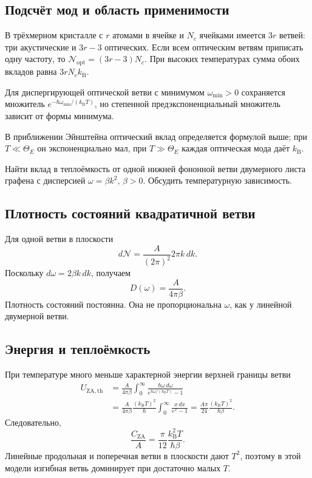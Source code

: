 \documentclass[../final.tex]{subfiles}
\begin{document}
\subsection*{Подсчёт мод и область применимости}

В трёхмерном кристалле с $r$ атомами в ячейке и $N_c$ ячейками
имеется $3r$ ветвей: три акустические и $3r-3$ оптических.
Если всем оптическим ветвям приписать одну частоту, то
$\mathcal N_{\mathrm{opt}}=(3r-3)N_c$.
При высоких температурах сумма обоих вкладов равна
$3rN_ck_{\mathrm B}$.

 Для диспергирующей оптической ветви
с минимумом $\omega_{\min}>0$ сохраняется множитель
$e^{-\hbar\omega_{\min}/(k_{\mathrm B}T)}$,
но степенной предэкспоненциальный множитель зависит от формы минимума.

\answer
В приближении Эйнштейна оптический вклад определяется формулой выше;
при $T\ll\Theta_E$ он экспоненциально мал, при $T\gg\Theta_E$
каждая оптическая мода даёт $k_{\mathrm B}$.


\condition
Найти вклад в теплоёмкость от одной нижней фононной ветви
двумерного листа графена с дисперсией $\omega=\beta k^2$, $\beta>0$.
Обсудить температурную зависимость.

\solution

\subsection*{Плотность состояний квадратичной ветви}

Для одной ветви в плоскости
\[
    d\mathcal N=\frac A{(2\pi)^2}2\pi k\,dk.
\]
Поскольку $d\omega=2\beta k\,dk$, получаем
\[
    D(\omega)=\frac A{4\pi\beta}.
\]
Плотность состояний постоянна. Она не пропорциональна $\omega$,
как у линейной двумерной ветви.

\subsection*{Энергия и теплоёмкость}

При температуре много меньше характерной энергии верхней границы ветви
\begin{align*}
    U_{\mathrm{ZA,th}}
       &=\frac A{4\pi\beta}\int_0^\infty
          \frac{\hbar\omega\,d\omega}{e^{\hbar\omega/(k_{\mathrm B}T)}-1}\\
       &=\frac A{4\pi\beta}\frac{(k_{\mathrm B}T)^2}{\hbar}
          \int_0^\infty\frac{x\,dx}{e^x-1}
        =\frac{A\pi}{24}\frac{(k_{\mathrm B}T)^2}{\hbar\beta}.
\end{align*}
Следовательно,
\[
    \frac{C_{\mathrm{ZA}}}{A}
       =\frac\pi{12}\frac{k_{\mathrm B}^2T}{\hbar\beta}.
\]
Линейные продольная и поперечная ветви в плоскости дают $T^2$,
поэтому в этой модели изгибная ветвь доминирует при достаточно малых $T$.
\end{document}
